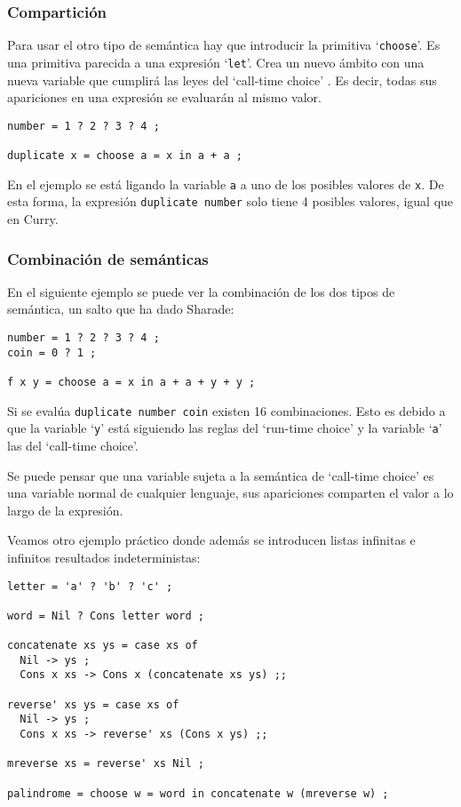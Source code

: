 \documentclass[class=article, crop=false]{standalone}
\begin{document}
\subsubsection{Compartición}

Para usar el otro tipo de semántica hay que introducir la primitiva `\verb`choose`'. Es una
primitiva parecida a una expresión `\verb`let`'. Crea un nuevo ámbito con una nueva variable
que cumplirá las leyes del `call-time choice' \cite{lopez2007simple}. Es decir, todas sus
apariciones en una expresión se evaluarán al mismo valor.

\begin{verbatim}
number = 1 ? 2 ? 3 ? 4 ;

duplicate x = choose a = x in a + a ;
\end{verbatim}

En el ejemplo se está ligando la variable \verb`a` a uno de los posibles valores de \verb`x`.
De esta forma, la expresión \verb`duplicate number` solo tiene 4 posibles valores, igual que
en Curry.

\subsubsection{Combinación de semánticas}

En el siguiente ejemplo se puede ver la combinación de los dos tipos de semántica, un salto
que ha dado Sharade:

\begin{verbatim}
number = 1 ? 2 ? 3 ? 4 ;
coin = 0 ? 1 ;

f x y = choose a = x in a + a + y + y ;
\end{verbatim}

Si se evalúa \verb`duplicate number coin` existen 16 combinaciones. Esto es debido a que la
variable `\verb`y`' está siguiendo las reglas del `run-time choice' y la variable `\verb`a`'
las del `call-time choice'.

Se puede pensar que una variable sujeta a la semántica de `call-time choice' es una variable
normal de cualquier lenguaje, sus apariciones comparten el valor a lo largo de la expresión.

Veamos otro ejemplo práctico donde además se introducen listas infinitas e infinitos
resultados indeterministas:

\begin{verbatim}
letter = 'a' ? 'b' ? 'c' ;

word = Nil ? Cons letter word ;

concatenate xs ys = case xs of
  Nil -> ys ;
  Cons x xs -> Cons x (concatenate xs ys) ;;

reverse' xs ys = case xs of
  Nil -> ys ;
  Cons x xs -> reverse' xs (Cons x ys) ;;

mreverse xs = reverse' xs Nil ;

palindrome = choose w = word in concatenate w (mreverse w) ;
\end{verbatim}
\end{document}
